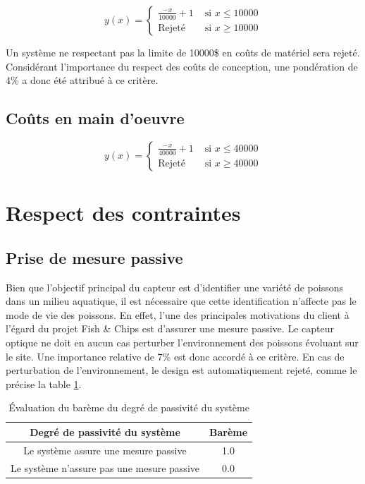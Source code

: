 \begin{equation}
y(x) = \begin{cases}
        \frac{-x}{10000} + 1 & \text{ si } x \leq 10000\\
        \text{Rejeté} & \text{ si } x \ge 10000
    \end{cases}
    \label{eq:bareme_cout_materiel}
\end{equation}

Un système ne respectant pas la limite de 10000\$ en coûts de matériel sera rejeté. Considérant l'importance du respect des coûts de conception, une pondération de 4\% a donc été attribué à ce critère.

\subsection{Coûts en main d'oeuvre}

\begin{equation}
y(x) = \begin{cases}
        \frac{-x}{40000} + 1 & \text{ si } x \leq 40000\\
        \text{Rejeté} & \text{ si } x \ge 40000
    \end{cases}
    \label{eq:bareme_cout_logiciel}
\end{equation}

\section{Respect des contraintes}

\subsection{Prise de mesure passive}

Bien que l'objectif principal du capteur est d'identifier une variété de poissons dans un milieu aquatique, il est nécessaire que cette identification n'affecte pas le mode de vie des poissons. En effet, l'une des principales motivations du client à l'égard du projet Fish \& Chips est d'assurer une mesure passive. Le capteur optique ne doit en aucun cas perturber l'environnement des poissons évoluant sur le site. Une importance relative de 7\% est donc accordé à ce critère. En cas de perturbation de l'environnement, le design est automatiquement rejeté, comme le précise la table \ref{t:bareme_systeme_passif}.

\begin{table}[htp]
   \footnotesize
   \centering
   \begin{tabular}{|c|c|}
        \hline
        Degré de passivité du système & Barème\\
        \hline
        \hline
        Le système assure une mesure passive & 1.0 \\
        \hline
        Le système n'assure pas une mesure passive & 0.0 \\
        \hline
   \end{tabular}
   \caption{Évaluation du barème du degré de passivité du système}
   \label{t:bareme_systeme_passif}
\end{table}

